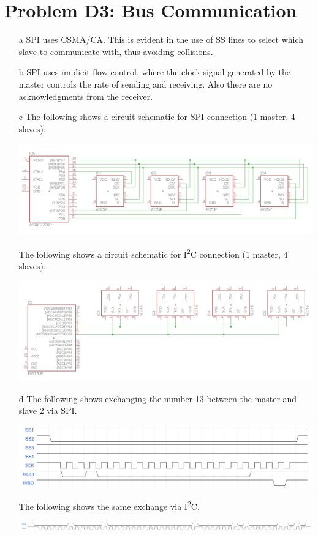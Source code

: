 \documentclass[]{article}
\begin{document}
\section{Problem D3: Bus Communication}
\begin{itemize}
	\item[a] SPI uses CSMA/CA. This is evident in the use of SS lines to select which slave to communicate with, thus avoiding collisions.
	\item[b] SPI uses implicit flow control, where the clock signal generated by the master controls the rate of sending and receiving. Also there are no acknowledgments from the receiver.
	\item[c] The following shows a circuit schematic for SPI connection (1 master, 4 slaves).
	
	\includegraphics[width=\textwidth]{spi.png}
	
	The following shows a circuit schematic for I\textsuperscript{2}C connection (1 master, 4 slaves).
	
	\includegraphics[width=\textwidth]{i2c.png}
	
	\item[d] The following shows exchanging the number 13 between the master and slave 2 via SPI.
	
	\includegraphics[width=\textwidth]{spi_wave.png}
	
	The following shows the same exchange via I\textsuperscript{2}C.
	
	\includegraphics[width=\textwidth]{i2c_wave.png}
\end{itemize}
\end{document}
